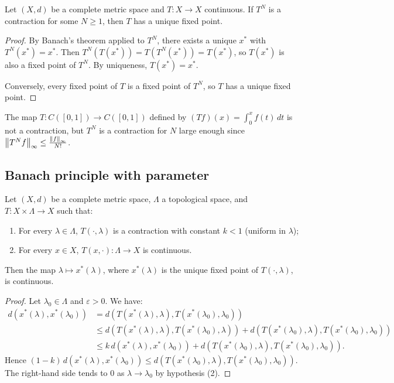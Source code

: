 \begin{theorem}
Let $(X, d)$ be a complete metric space and $T : X \to X$ continuous. If $T^N$
is a contraction for some $N \geq 1$, then $T$ has a unique fixed point.
\end{theorem}

\begin{proof}
By Banach's theorem applied to $T^N$, there exists a unique $x^*$ with
$T^N(x^*) = x^*$. Then $T^N(T(x^*)) = T(T^N(x^*)) = T(x^*)$, so $T(x^*)$ is
also a fixed point of $T^N$. By uniqueness, $T(x^*) = x^*$.

Conversely, every fixed point of $T$ is a fixed point of $T^N$, so $T$ has a
unique fixed point.
\end{proof}

\begin{example}
The map $T : C([0,1]) \to C([0,1])$ defined by $(Tf)(x) = \int_0^x f(t) \, dt$
is not a contraction, but $T^N$ is a contraction for $N$ large enough since
$\left\| T^N f \right\|_\infty \leq \frac{\left\| f \right\|_\infty}{N!}$.
\end{example}

\subsection{Banach principle with parameter}

\begin{theorem}
Let $(X, d)$ be a complete metric space, $\Lambda$ a topological space, and
$T : X \times \Lambda \to X$ such that:
\begin{enumerate}
    \item For every $\lambda \in \Lambda$, $T(\cdot, \lambda)$ is a contraction
          with constant $k < 1$ (uniform in $\lambda$);
    \item For every $x \in X$, $T(x, \cdot) : \Lambda \to X$ is continuous.
\end{enumerate}
Then the map $\lambda \mapsto x^*(\lambda)$, where $x^*(\lambda)$ is the unique
fixed point of $T(\cdot, \lambda)$, is continuous.
\end{theorem}

\begin{proof}
Let $\lambda_0 \in \Lambda$ and $\varepsilon > 0$. We have:
\begin{align*}
    d(x^*(\lambda), x^*(\lambda_0))
    &= d(T(x^*(\lambda), \lambda), T(x^*(\lambda_0), \lambda_0)) \\
    &\leq d(T(x^*(\lambda), \lambda), T(x^*(\lambda_0), \lambda))
         + d(T(x^*(\lambda_0), \lambda), T(x^*(\lambda_0), \lambda_0)) \\
    &\leq k \, d(x^*(\lambda), x^*(\lambda_0))
         + d(T(x^*(\lambda_0), \lambda), T(x^*(\lambda_0), \lambda_0)).
\end{align*}
Hence $(1-k) \, d(x^*(\lambda), x^*(\lambda_0)) \leq
d(T(x^*(\lambda_0), \lambda), T(x^*(\lambda_0), \lambda_0))$. The right-hand
side tends to $0$ as $\lambda \to \lambda_0$ by hypothesis (2).
\end{proof}

